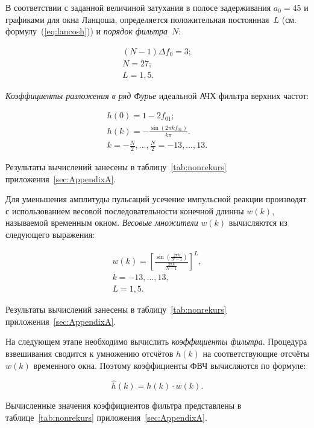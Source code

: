 \point В соответствии с заданной величиной затухания в полосе
задерживания $a_0 = 45$ и графиками для окна Ланцоша, определяется
положительная постоянная~$L$ (см. формулу~(\ref{eq:lancosh})) и
\textit{порядок фильтра}~$N$:

\begin{gather*}
  (N-1)\Delta f_0 = 3;\\
  N = 27;\\
  L = 1{,}5.
\end{gather*}


\point \textit{Коэффициенты разложения в ряд Фурье} идеальной АЧХ
фильтра верхних частот:

\begin{gather}
  \nonumber
  h(0) = 1 - 2f_{01};\\
  \label{eq:koef_furier}
  h(k) = - \frac{\sin(2 \pi k f_{01})}{k \pi}.\\
  \nonumber
  k = - \frac{N}{2}, \ldots , \frac{N}{2} = -13, \ldots, 13.
\end{gather}

Результаты вычислений занесены в таблицу~\ref{tab:nonrekurs}
приложения~\ref{sec:AppendixA}.


\point Для уменьшения амплитуды пульсаций усечение импульсной реакции
производят с использованием весовой последовательности конечной длинны
$w(k)$, называемой временным окном. \textit{Весовые множители} $w(k)$
вычисляются из следующего выражения:

\begin{gather}
  \label{eq:lancosh}
  w(k) = \left[\frac{\displaystyle\sin\left(\frac{2\pi
          k}{N-1}\right)}{\displaystyle\frac{2\pi k}{N-1}}\right]^L,\\
  \nonumber
  k = -13, \ldots, 13,\\
  \nonumber
  L = 1{,}5.
\end{gather}

Результаты вычислений занесены в таблицу~\ref{tab:nonrekurs}
приложения~\ref{sec:AppendixA}.


\point На следующем этапе необходимо вычислить \textit{коэффициенты
  фильтра}. Процедура взвешивания сводится к умножению отсчётов $h(k)$
на соответствующие отсчёты $w(k)$ временного окна. Поэтому
коэффициенты ФВЧ вычисляются по формуле:

\begin{equation*}
  \hat h(k) = h(k) \cdot w(k).
\end{equation*}

Вычисленные значения коэффициентов фильтра представлены в
таблице~\ref{tab:nonrekurs} приложения~\ref{sec:AppendixA}.


